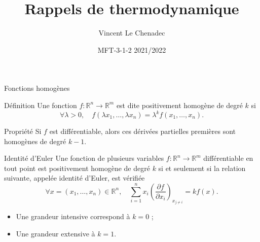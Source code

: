 \documentclass[
  ignorenonframetext,
]{beamer}
\title{Rappels de thermodynamique}
\author{Vincent Le Chenadec}
\date{MFT-3-1-2 2021/2022}
\providecommand{\tightlist}{%
  \setlength{\itemsep}{0pt}\setlength{\parskip}{0pt}}
\begin{document}
\frame{\titlepage}

\begin{frame}{Fonctions homogènes}
\protect\hypertarget{fonctions-homoguxe8nes}{}
\begin{block}{Définition}
\protect\hypertarget{duxe9finition}{}
Une fonction \(f \colon \mathbb{R} ^ n \to \mathbb{R} ^ m\) est dite
positivement homogène de degré \(k\) si \[
\forall \lambda > 0, \quad f \left ( \lambda x _ 1, \ldots, \lambda x _ n \right ) = \lambda ^ k f \left ( x _ 1, \ldots, x _ n \right ).
\]
\end{block}

\begin{block}{Propriété}
\protect\hypertarget{propriuxe9tuxe9}{}
Si \(f\) est différentiable, alors ces dérivées partielles premières
sont homogènes de degré \(k - 1\).
\end{block}
\end{frame}

\begin{frame}
\begin{block}{Identité d'Euler}
\protect\hypertarget{identituxe9-deuler}{}
Une fonction de plusieurs variables
\(f \colon \mathbb{R} ^ n \to \mathbb{R} ^ m\) différentiable en tout
point est positivement homogène de degré \(k\) si et seulement si la
relation suivante, appelée identité d'Euler, est vérifiée \[
\forall x = \left ( x_1, \ldots, x _ n \right ) \in \mathbb{R} ^ n, \quad \sum _ {i = 1} ^ n x _ i \left ( \frac{\partial f}{\partial x _ i} \right ) _ {x _ {j \ne i}} = k f \left ( x \right ).
\]

\begin{itemize}
\tightlist
\item
  Une grandeur intensive correspond à \(k = 0\) ;
\item
  Une grandeur extensive à \(k = 1\).
\end{itemize}
\end{block}
\end{frame}
\end{document}
